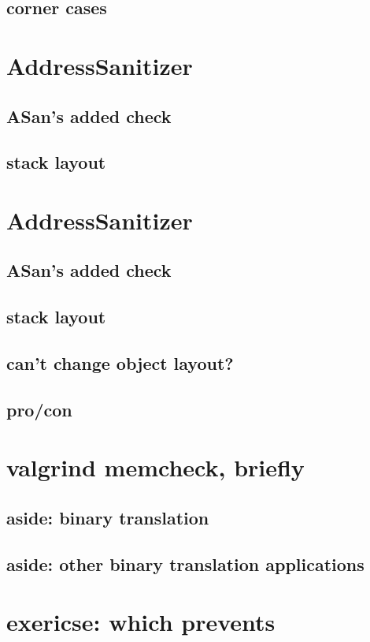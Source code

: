 \subsection{corner cases}


\section{AddressSanitizer}


\subsection{ASan's added check}


\subsection{stack layout}


\section{AddressSanitizer}


\subsection{ASan's added check}


\subsection{stack layout}


\subsection{can't change object layout?}



\subsection{pro/con}


\section{valgrind memcheck, briefly}


\subsection{aside: binary translation}


\subsection{aside: other binary translation applications}

\section{exericse: which prevents}

